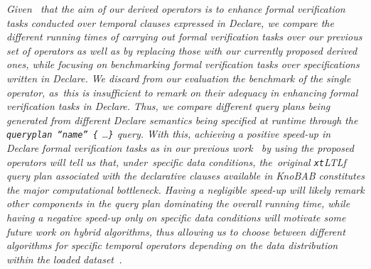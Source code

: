 \documentclass[information,article,accept,pdftex,oneauthor]{Definitions/mdpi}
\begin{document}
\textit{{Given} %
~that the aim of our derived operators is to enhance formal verification tasks conducted over temporal clauses expressed in Declare, we compare the different running times of carrying out formal verification tasks over our previous set of operators as well as by replacing those with our currently proposed derived ones, while focusing on benchmarking formal verification tasks over specifications written in Declare. We discard from our evaluation the benchmark of the single operator, as~this is insufficient to remark on their adequacy in enhancing formal verification tasks in Declare. Thus, we compare different query plans being generated from different Declare semantics being specified at runtime through the \texttt{queryplan ``name'' \{} \ldots \texttt{\}} query.  %
With this, achieving a positive speed-up in Declare formal verification tasks as in our previous work~\cite{info14030173} by using the proposed operators will tell us that, under~specific data conditions, the~original \texttt{xt}LTL\textsf{f} query plan associated with the declarative clauses available in KnoBAB constitutes the major computational bottleneck. Having a negligible speed-up will likely remark  other components in the query plan dominating the overall running time, while having a negative speed-up only on specific data conditions will motivate some future work on hybrid algorithms, thus allowing us to choose between different algorithms for specific temporal operators depending on the data distribution within the loaded dataset~\cite{DBLP:journals/spe/Musser97}.} 
\end{document}
